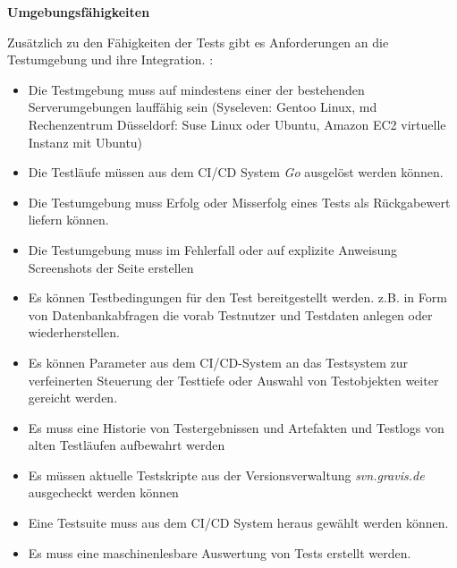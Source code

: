 \textbf{Umgebungsfähigkeiten}

Zusätzlich zu den Fähigkeiten der Tests gibt es Anforderungen an die
Testumgebung und ihre Integration. :

\begin{itemize}
\itemsep1pt\parskip0pt
\item
  Die Testmgebung muss auf mindestens einer der bestehenden
  Serverumgebungen lauffähig sein (Syseleven: Gentoo Linux, md
  Rechenzentrum Düsseldorf: Suse Linux oder Ubuntu, Amazon EC2 virtuelle
  Instanz mit Ubuntu)
\item
  Die Testläufe müssen aus dem CI/CD System \emph{Go} ausgelöst werden
  können.
\item
  Die Testumgebung muss Erfolg oder Misserfolg eines Tests als
  Rückgabewert liefern können.
\item
  Die Testumgebung muss im Fehlerfall oder auf explizite Anweisung
  Screenshots der Seite erstellen
\item
  Es können Testbedingungen für den Test bereitgestellt werden. z.B. in
  Form von Datenbankabfragen die vorab Testnutzer und Testdaten anlegen
  oder wiederherstellen.
\item
  Es können Parameter aus dem CI/CD-System an das Testsystem zur
  verfeinerten Steuerung der Testtiefe oder Auswahl von Testobjekten
  weiter gereicht werden.
\item
  Es muss eine Historie von Testergebnissen und Artefakten und Testlogs
  von alten Testläufen aufbewahrt werden
\item
  Es müssen aktuelle Testskripte aus der Versionsverwaltung
  \emph{svn.gravis.de} ausgecheckt werden können
\item
  Eine Testsuite muss aus dem CI/CD System heraus gewählt werden können.
\item
  Es muss eine maschinenlesbare Auswertung von Tests erstellt werden.
\end{itemize}
